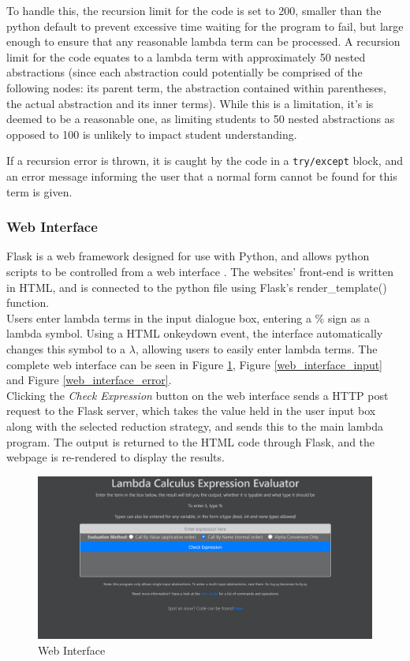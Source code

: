 \documentclass[a4paper,12pt]{report}
\begin{document}
To handle this, the recursion limit for the code is set to 200, smaller than the python default to prevent excessive time waiting for the program to fail, but large enough to ensure that any reasonable lambda term can be processed. A recursion limit for the code equates to a lambda term with approximately 50 nested abstractions (since each abstraction could potentially be comprised of the following nodes: its parent term, the abstraction contained within parentheses, the actual abstraction and its inner terms). While this is a limitation, it's is deemed to be a reasonable one, as limiting students to 50 nested abstractions as opposed to 100 is unlikely to impact student understanding.

If a recursion error is thrown, it is caught by the code in a \texttt{try/except} block, and an error message informing the user that a normal form cannot be found for this term is given.

\subsubsection{Web Interface}

Flask is a web framework designed for use with Python, and allows python scripts to be controlled from a web interface \cite{FullStack2019}. The websites' front-end is written in HTML, and is connected to the python file using Flask's render_template() function.\\

Users enter lambda terms in the input dialogue box, entering a \% sign as a lambda symbol. Using a HTML onkeydown event, the interface automatically changes this symbol to a $\lambda$, allowing users to easily enter lambda terms. The complete web interface can be seen in Figure \ref{web_interface_no_input}, Figure \ref{web_interface_input} and Figure \ref{web_interface_error}.\\

Clicking the \textit{Check Expression} button on the web interface sends a HTTP post request to the Flask server, which takes the value held in the user input box along with the selected reduction strategy, and sends this to the main lambda program. The output is returned to the HTML code through Flask, and the webpage is re-rendered to display the results.\\

\begin{figure}[p]
	\includegraphics[scale=0.3]{images/web_interface_no_input}
	\centering
	\caption{Web Interface}
	\label{web_interface_no_input}
\end{figure}
\end{document}
